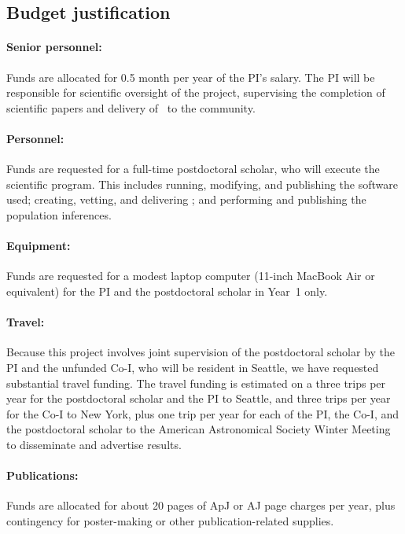 \documentclass[12pt]{article}
\begin{document}
\subsection*{Budget justification}

\paragraph{Senior personnel:}
Funds are allocated for 0.5 month per year of the PI's salary.
The PI will be responsible for scientific oversight of the project,
supervising the completion of scientific papers and delivery of
\catalogname\ to the community.

\paragraph{Personnel:}
Funds are requested for a full-time postdoctoral scholar, who will
execute the scientific program.
This includes running, modifying, and publishing the software used;
creating, vetting, and delivering \catalogname;
and performing and publishing the population inferences.

\paragraph{Equipment:}
Funds are requested for a modest laptop computer (11-inch MacBook Air
or equivalent) for the PI and the postdoctoral scholar in Year~1 only.

\paragraph{Travel:}
Because this project involves joint supervision of the postdoctoral
scholar by the PI and the unfunded Co-I, who will be resident in
Seattle, we have requested substantial travel funding.
The travel funding is estimated on a three trips per year for the
postdoctoral scholar and the PI to Seattle, and three trips per year
for the Co-I to New York, plus one trip per year for each of the PI,
the Co-I, and the postdoctoral scholar to the American Astronomical
Society Winter Meeting to disseminate and advertise results.

\paragraph{Publications:}
Funds are allocated for about 20 pages of ApJ or AJ page charges per
year, plus contingency for poster-making or other publication-related
supplies.
\end{document}
